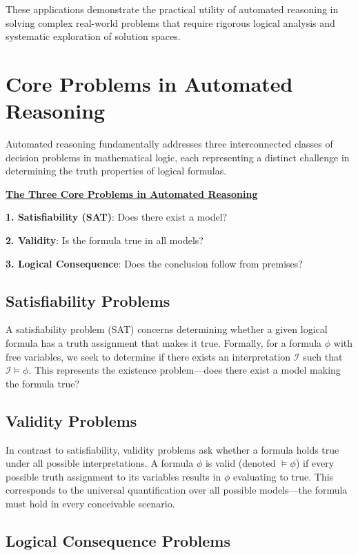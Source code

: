 \documentclass[11pt,a4paper]{article}
\theoremstyle{definition}
\theoremstyle{plain}
\theoremstyle{remark}
\begin{document}
These applications demonstrate the practical utility of automated reasoning in solving complex real-world problems that require rigorous logical analysis and systematic exploration of solution spaces.


\section{Core Problems in Automated Reasoning}

Automated reasoning fundamentally addresses three interconnected classes of decision problems in mathematical logic, each representing a distinct challenge in determining the truth properties of logical formulas.

\begin{center}
\textbf{\underline{The Three Core Problems in Automated Reasoning}}
\end{center}

\textbf{1. Satisfiability (SAT)}: Does there exist a model?

\textbf{2. Validity}: Is the formula true in all models?

\textbf{3. Logical Consequence}: Does the conclusion follow from premises?

\subsection{Satisfiability Problems}

A satisfiability problem (SAT) concerns determining whether a given logical formula has a truth assignment that makes it true. Formally, for a formula $\phi$ with free variables, we seek to determine if there exists an interpretation $\mathcal{I}$ such that $\mathcal{I} \models \phi$. This represents the existence problem---does there exist a model making the formula true?

\subsection{Validity Problems}

In contrast to satisfiability, validity problems ask whether a formula holds true under all possible interpretations. A formula $\phi$ is valid (denoted $\models \phi$) if every possible truth assignment to its variables results in $\phi$ evaluating to true. This corresponds to the universal quantification over all possible models---the formula must hold in every conceivable scenario.

\subsection{Logical Consequence Problems}
\end{document}
